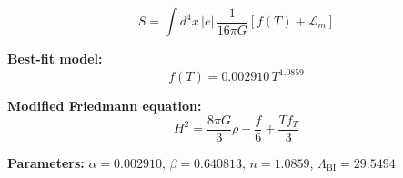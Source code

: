 
\begin{equation}
  S = \int d^4x \, |e| \, \frac{1}{16\pi G} \left[ f(T) + \mathcal{L}_m \right]
\end{equation}

\textbf{Best-fit model:}
\begin{equation}
  f(T) = 0.002910 \, T^{1.0859}
\end{equation}

\textbf{Modified Friedmann equation:}
\begin{equation}
  H^2 = \frac{8\pi G}{3} \rho - \frac{f}{6} + \frac{T f_T}{3}
\end{equation}

\textbf{Parameters:}
$\alpha = 0.002910$, \quad
$\beta = 0.640813$, \quad
$n = 1.0859$, \quad
$\Lambda_{\text{BI}} = 29.5494$